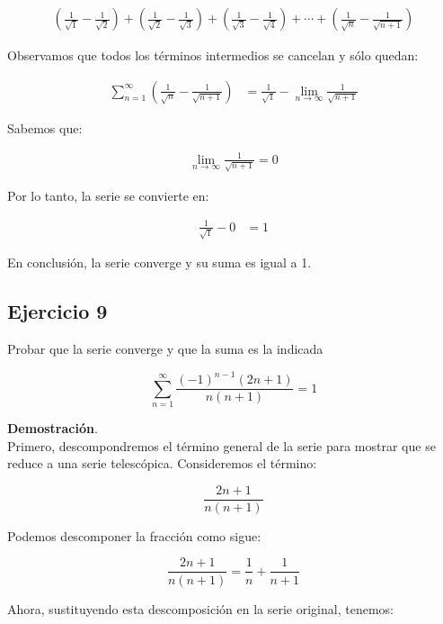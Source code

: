 \documentclass{article}
\begin{document}
    \begin{align*}
    \left(\frac{1}{\sqrt{1}} - \frac{1}{\sqrt{2}}\right)
    + \left(\frac{1}{\sqrt{2}} - \frac{1}{\sqrt{3}}\right)
    + \left(\frac{1}{\sqrt{3}} - \frac{1}{\sqrt{4}}\right)
    + \cdots
    + \left(\frac{1}{\sqrt{n}} - \frac{1}{\sqrt{n+1}}\right)
    \end{align*}

    Observamos que todos los términos intermedios se cancelan y sólo quedan:

    \begin{align*}
    \sum_{n=1}^{\infty} \left(\frac{1}{\sqrt{n}} - \frac{1}{\sqrt{n+1}}\right)
    &= \frac{1}{\sqrt{1}} - \lim_{n \to \infty} \frac{1}{\sqrt{n+1}}
    \end{align*}

    Sabemos que:

    \begin{align*}
    \lim_{n \to \infty} \frac{1}{\sqrt{n+1}} = 0
    \end{align*}

    Por lo tanto, la serie se convierte en:

    \begin{align*}
    \frac{1}{\sqrt{1}} - 0 &= 1
    \end{align*}

    En conclusión, la serie converge y su suma es igual a 1.



    \subsection*{Ejercicio 9}

    Probar que la serie converge y que la suma es la indicada

    $$
    \sum_{n=1}^{\infty} \frac{(-1)^{n-1}(2 n+1)}{n(n+1)}=1
    $$

    \textbf{Demostración}.\\

    Primero, descompondremos el término general de la serie para mostrar que se reduce a una serie telescópica. Consideremos el término:

    $$
    \frac{2 n+1}{n(n+1)}
    $$

    Podemos descomponer la fracción como sigue:

    $$
    \frac{2 n+1}{n(n+1)}=\frac{1}{n}+\frac{1}{n+1}
    $$

    Ahora, sustituyendo esta descomposición en la serie original, tenemos:
\end{document}

